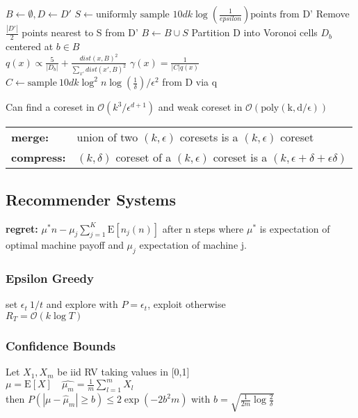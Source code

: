 \documentclass[10pt,parskip]{scrartcl}
\newcommand{\E}{\textrm{E}}
\begin{document}
\begin{multicols*}{3}
\begin{mdframed}
	\begin{algorithmic}
 		\State $B \gets \emptyset, D \gets D'$
			\State $S \gets \textrm{uniformly sample } 10dk \log(\frac{1}{epsilon}) \textrm{points from D'}$
			\State Remove $\frac{|D'|}{2}$ points nearest to S from D'
			\State $B \gets B \cup S$
		\EndWhile
		\State Partition D into Voronoi cells $D_b$ centered at $b \in B$ \\
		$q(x)\propto \frac{5}{|D_b|} + \frac{dist(x,B)^2}{\sum_{x'}dist(x',B)^2}$ \qquad $\gamma(x) = \frac{1}{|C|q(x)}$ \\
		\State $C \gets \mathrm{sample} \ 10dk \log^2 n \log(\frac{1}{\delta})/\epsilon^2$ from D via q 
 	\end{algorithmic}
\end{mdframed}

Can find a coreset in $\mathcal{O}(k^3/\epsilon^{d+1})$ and weak coreset in $\mathcal{O}(\mathrm{poly(k,d/\epsilon)})$ \\
\begin{tabular}{l l}
\textbf{merge:} & union of two $(k,\epsilon)$ coresets is a $(k,\epsilon)$ coreset \\
\textbf{compress:} & $(k,\delta)$ coreset of a $(k,\epsilon)$ coreset is a $(k,\epsilon + \delta + \epsilon \delta)$
\end{tabular}

\subsection{Recommender Systems} %
\label{sub:recommenders}
\textbf{regret: } $\mu^\ast n - \mu_j \sum_{j=1}^K \E[n_j(n)]$ after n steps where $\mu^\ast$ is expectation of optimal machine payoff and $\mu_j$ expectation of machine j.
\subsubsection{Epsilon Greedy} %
\label{ssub:k_armed}
set $\epsilon_t ~ 1 / t$ and explore with $P=\epsilon_t$, exploit otherwise \\
$R_T = \mathcal{O}(k \log T)$
\subsubsection{Confidence Bounds} %
\label{ssub:confidence_bounds}
Let $X_1,X_m$ be iid RV taking values in [0,1] \\
$\mu = \mathrm{E}[X] \quad \hat{\mu_m}=\frac{1}{m} \sum_{l=1}^{m} X_l$ \\
then $P(|\mu - \hat{\mu}_m| \geq b) \leq 2 \exp(-2b^2m)$ with $b=\sqrt{\frac{1}{2m}\log\frac{2}{\delta}}$

\end{multicols*}
\end{document}
